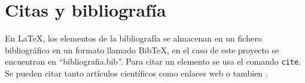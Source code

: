




% 

% 

% 



\section{Citas y bibliografía}
En LaTeX, los elementos de la bibliografía se almacenan en un fichero bibliográfico en un formato llamado BibTeX, en el caso de este proyecto se encuentran en ``bibliografia.bib''. Para citar un elemento se usa el comando \texttt{cite}. Se pueden citar tanto artículos científicos \parencite{borrego2019} como enlaces web \parencite{webETSII} o tambien \parencite{aki1977}. 

